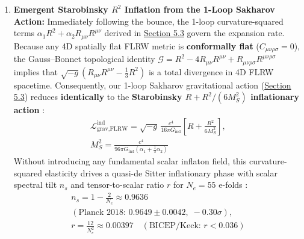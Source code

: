 \documentclass[10pt,aps,prd,twocolumn,superscriptaddress,nofootinbib,floatfix,longbibliography,showkeys]{revtex4-2}
\begin{document}
\begin{enumerate}
\begin{itemize}
  \end{itemize}
  During the $\rho \propto a^{-6}$ stiff-matter epoch, integrating this equation yields the exact analytical \textbf{Non-Singular Soliton Bounce} (\textbf{\hyperref[fig:fig4]{Figure 4(a)}}, solid green curve for $a(t)/a_{\min}$, with the normalized Hubble expansion rate $\tau_B H(t)$ shown as the dashed blue curve):
\begin{equation}\begin{gathered}
\frac{a(t)}{a_{\min}} = \left(1 + \frac{9 t^2}{\tau_B^2}\right)^{1/6}, \qquad H(0) = 0, \\
\ddot{a}(0) = \frac{3 a_{\min}}{\tau_B^2} > 0, \qquad \tau_B = \sqrt{\frac{3}{8\pi G_{\text{ind}}\rho_{\text{crit}}^{\text{UV}}}}
\end{gathered}\end{equation}
  completely eliminating the $a = 0$ curvature divergence of classical General Relativity (red dotted curve in \textbf{\hyperref[fig:fig4]{Figure 4(a)}}).
  \item \textbf{Emergent Starobinsky $R^2$ Inflation from the 1-Loop Sakharov Action:} Immediately following the bounce, the 1-loop curvature-squared terms $\alpha_1 R^2 + \alpha_2 R_{\mu\nu}R^{\mu\nu}$ derived in \hyperref[sec:5.3]{Section 5.3} govern the expansion rate. Because any 4D spatially flat FLRW metric is \textbf{conformally flat} ($C_{\mu\nu\rho\sigma} = 0$), the Gauss--Bonnet topological identity $\mathcal{G} = R^2 - 4 R_{\mu\nu}R^{\mu\nu} + R_{\mu\nu\rho\sigma}R^{\mu\nu\rho\sigma}$ implies that $\sqrt{-g}\left(R_{\mu\nu}R^{\mu\nu} - \frac{1}{3}R^2\right)$ is a total divergence in 4D FLRW spacetime. Consequently, our 1-loop Sakharov gravitational action (\hyperref[sec:5.3]{Section 5.3}) reduces \textbf{identically} to the \textbf{Starobinsky $R + R^2 / (6 M_S^2)$ inflationary action} \cite{ref27}:
\begin{equation}\begin{gathered}
\mathcal{L}_{\text{grav,FLRW}}^{\text{ind}} = \sqrt{-g}\,\frac{c^4}{16\pi G_{\text{ind}}}\left[ R + \frac{R^2}{6 M_S^2} \right], \\
M_S^2 = \frac{c^4}{96\pi G_{\text{ind}}\left(\alpha_1 + \frac{1}{3}\alpha_2\right)}
\end{gathered}\end{equation}
  Without introducing any fundamental scalar inflaton field, this curvature-squared elasticity drives a quasi-de Sitter inflationary phase with scalar spectral tilt $n_s$ and tensor-to-scalar ratio $r$ for $N_e = 55$ e-folds \cite{ref27,ref28,ref29}:
\begin{equation}\begin{gathered}
n_s = 1 - \frac{2}{N_e} \approx 0.9636 \\
(\text{Planck 2018: } 0.9649 \pm 0.0042, \;-0.30\sigma), \\
r = \frac{12}{N_e^2} \approx 0.00397 \quad (\text{BICEP/Keck: } r < 0.036)
\end{gathered}\end{equation}

\end{enumerate}
\end{document}

